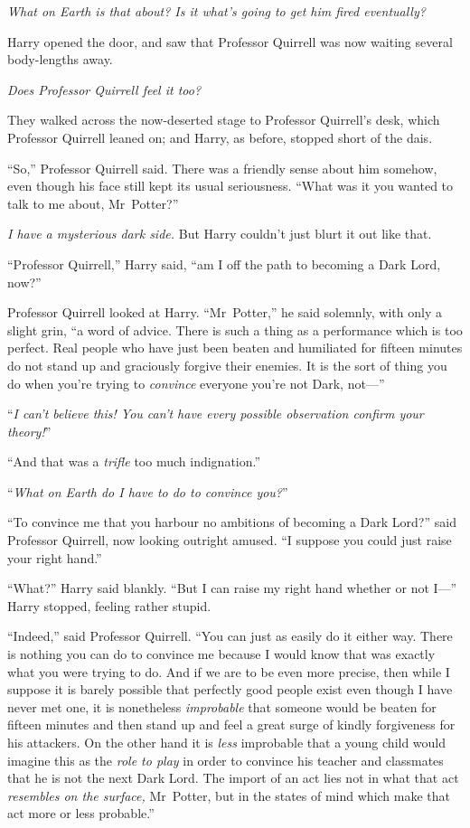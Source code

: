 \emph{What on Earth is that about? Is it what’s going to get him fired eventually?}

Harry opened the door, and saw that Professor Quirrell was now waiting several body-lengths away.

\emph{Does Professor Quirrell feel it too?}

They walked across the now-deserted stage to Professor Quirrell’s desk, which Professor Quirrell leaned on; and Harry, as before, stopped short of the dais.

“So,” Professor Quirrell said. There was a friendly sense about him somehow, even though his face still kept its usual seriousness. “What was it you wanted to talk to me about, Mr~Potter?”

\emph{I have a mysterious dark side.} But Harry couldn’t just blurt it out like that.

“Professor Quirrell,” Harry said, “am I off the path to becoming a Dark Lord, now?”

Professor Quirrell looked at Harry. “Mr~Potter,” he said solemnly, with only a slight grin, “a word of advice. There is such a thing as a performance which is too perfect. Real people who have just been beaten and humiliated for fifteen minutes do not stand up and graciously forgive their enemies. It is the sort of thing you do when you’re trying to \emph{convince} everyone you’re not Dark, not—”

“\emph{I can’t believe this! You can’t have every possible observation confirm your theory!}”

“And that was a \emph{trifle} too much indignation.”

“\emph{What on Earth do I have to do to convince you?}”

“To convince me that you harbour no ambitions of becoming a Dark Lord?” said Professor Quirrell, now looking outright amused. “I suppose you could just raise your right hand.”

“What?” Harry said blankly. “But I can raise my right hand whether or not I—” Harry stopped, feeling rather stupid.

“Indeed,” said Professor Quirrell. “You can just as easily do it either way. There is nothing you can do to convince me because I would know that was exactly what you were trying to do. And if we are to be even more precise, then while I suppose it is barely possible that perfectly good people exist even though I have never met one, it is nonetheless \emph{improbable} that someone would be beaten for fifteen minutes and then stand up and feel a great surge of kindly forgiveness for his attackers. On the other hand it is \emph{less} improbable that a young child would imagine this as the \emph{role to play} in order to convince his teacher and classmates that he is not the next Dark Lord. The import of an act lies not in what that act \emph{resembles on the surface,} Mr~Potter, but in the states of mind which make that act more or less probable.”


